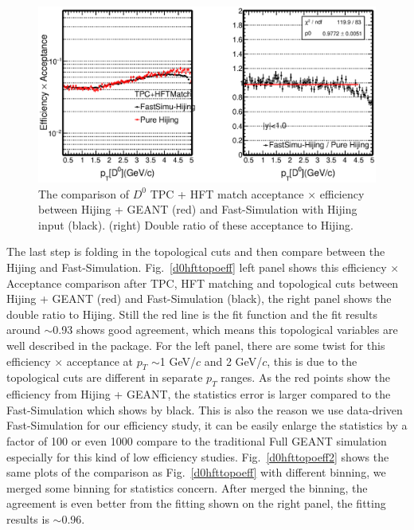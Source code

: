 \documentclass[a4paper]{article}
\begin{document}
\begin{figure}[htbp]
\centering
\includegraphics[keepaspectratio,width=1.0\textwidth]{fig/Physics_FastHijingVsPureHijing_HFTRatio2.eps}
\caption{The comparison of $D^0$ TPC + HFT match acceptance $\times$ efficiency between Hijing + GEANT (red) and Fast-Simulation with Hijing input (black). (right) Double ratio of these acceptance to Hijing.}
\label{d0hftmatcheff}
\end{figure}

The last step is folding in the topological cuts and then compare between the Hijing and Fast-Simulation. Fig.~\ref{d0hfttopoeff} left panel shows this efficiency $\times$ Acceptance comparison after TPC, HFT matching and topological cuts between Hijing + GEANT (red) and Fast-Simulation (black), the right panel shows the double ratio to Hijing. Still the red line is the fit function and the fit results around $\sim$0.93 shows good agreement, which means this topological variables are well described in the package. For the left panel, there are some twist for this efficiency $\times$ acceptance at $p_T$ $\sim$1 GeV/$c$ and 2 GeV/$c$, this is due to the topological cuts are different in separate $p_T$ ranges. As the red points show the efficiency from Hijing + GEANT, the statistics error is larger compared to the Fast-Simulation which shows by black. This is also the reason we use data-driven Fast-Simulation for our efficiency study, it can be easily enlarge the statistics by a factor of 100 or even 1000 compare to the traditional Full GEANT simulation especially for this kind of low efficiency studies. Fig.~\ref{d0hfttopoeff2} shows the same plots of the comparison as Fig.~\ref{d0hfttopoeff} with different binning, we merged some binning for statistics concern. After merged the binning, the agreement is even better from the fitting shown on the right panel, the fitting results is $\sim$0.96.
\end{document}
